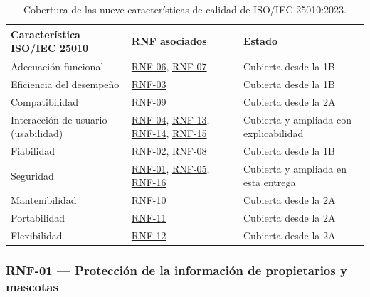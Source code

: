\documentclass[journal,onecolumn]{IEEEtran}
\begin{document}
	\begin{table}[H]
		\centering
		\caption{Cobertura de las nueve características de calidad de ISO/IEC 25010:2023.}
		\label{tab:cobertura-25010}
		\small
		\begin{tabularx}{\textwidth}{@{}p{5.2cm} p{3.2cm} X@{}}
			\toprule
			\textbf{Característica ISO/IEC 25010} & \textbf{RNF asociados} & \textbf{Estado} \\
			\midrule
			Adecuación funcional & \hyperref[tab:RNF-06]{RNF-06}, \hyperref[tab:RNF-07]{RNF-07} & Cubierta desde la 1B \\
			Eficiencia del desempeño & \hyperref[tab:RNF-03]{RNF-03} & Cubierta desde la 1B \\
			Compatibilidad & \hyperref[tab:RNF-09]{RNF-09} & Cubierta desde la 2A \\
			Interacción de usuario (usabilidad) & \hyperref[tab:RNF-04]{RNF-04}, \hyperref[tab:RNF-13]{RNF-13}, \hyperref[tab:RNF-14]{RNF-14}, \hyperref[tab:RNF-15]{RNF-15} & Cubierta y ampliada con explicabilidad \\
			Fiabilidad & \hyperref[tab:RNF-02]{RNF-02}, \hyperref[tab:RNF-08]{RNF-08} & Cubierta desde la 1B \\
			Seguridad & \hyperref[tab:RNF-01]{RNF-01}, \hyperref[tab:RNF-05]{RNF-05}, \hyperref[tab:RNF-16]{RNF-16} & Cubierta y ampliada en esta entrega \\
			Mantenibilidad & \hyperref[tab:RNF-10]{RNF-10} & Cubierta desde la 2A \\
			Portabilidad & \hyperref[tab:RNF-11]{RNF-11} & Cubierta desde la 2A \\
			Flexibilidad & \hyperref[tab:RNF-12]{RNF-12} & Cubierta desde la 2A \\
			\bottomrule
		\end{tabularx}
	\end{table}
	
	\subsubsection{RNF-01 --- Protección de la información de propietarios y mascotas}
	
\end{document}
